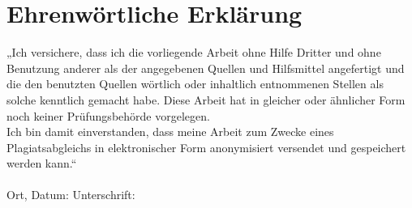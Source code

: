 \documentclass[a4paper,12pt]{thesis}
\begin{document}
\chapter*{Ehrenwörtliche Erklärung}
\label{erklaerung}

„Ich versichere, dass ich die vorliegende Arbeit ohne Hilfe Dritter und ohne Benutzung anderer als der angegebenen Quellen und Hilfsmittel angefertigt und die den benutzten Quellen wörtlich oder inhaltlich entnommenen Stellen als solche kenntlich gemacht habe. Diese Arbeit hat in gleicher oder ähnlicher Form noch keiner Prüfungsbehörde vorgelegen.\\
Ich bin damit einverstanden, dass meine Arbeit zum Zwecke eines Plagiatsabgleichs in elektronischer Form anonymisiert versendet und gespeichert werden kann.“ \\
\\[1.5cm]
Ort, Datum:	\hrulefill\enspace Unterschrift: \hrulefill
\\[3.5cm]
\end{document}
